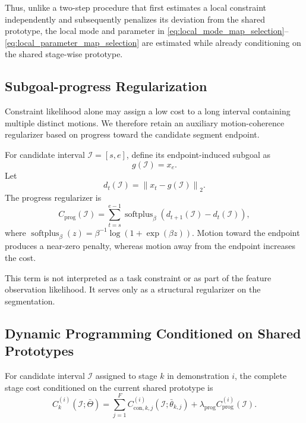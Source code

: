 \documentclass[lettersize,journal]{IEEEtran}
\begin{document}
Thus, unlike a two-step procedure that first estimates a local constraint
independently and subsequently penalizes its deviation from the shared
prototype, the local mode and parameter in
\eqref{eq:local_mode_map_selection}--\eqref{eq:local_parameter_map_selection}
are estimated while already conditioning on the shared stage-wise prototype.


\subsection{Subgoal-progress Regularization}
\label{subsec:subgoal_progress_map}

Constraint likelihood alone may assign a low cost to a long interval containing
multiple distinct motions. We therefore retain an auxiliary motion-coherence
regularizer based on progress toward the candidate segment endpoint.

For candidate interval
$\mathcal{I}=[s,e]$, define its endpoint-induced subgoal as
\begin{equation}
g(\mathcal{I})
=
x_e.
\label{eq:candidate_endpoint_subgoal_map}
\end{equation}
Let
\begin{equation}
d_t(\mathcal{I})
=
\left\|
x_t-g(\mathcal{I})
\right\|_2.
\label{eq:candidate_subgoal_distance_map}
\end{equation}
The progress regularizer is
\begin{equation}
C_{\mathrm{prog}}(\mathcal{I})
=
\sum_{t=s}^{e-1}
\operatorname{softplus}_{\beta}
\left(
d_{t+1}(\mathcal{I})
-
d_t(\mathcal{I})
\right),
\label{eq:progress_regularizer_map}
\end{equation}
where
$\operatorname{softplus}_{\beta}(z)
=
\beta^{-1}\log(1+\exp(\beta z))$.
Motion toward the endpoint produces a near-zero penalty, whereas motion away
from the endpoint increases the cost.

This term is not interpreted as a task constraint or as part of the feature
observation likelihood. It serves only as a structural regularizer on the
segmentation.


\subsection{Dynamic Programming Conditioned on Shared Prototypes}
\label{subsec:map_dynamic_programming}

For candidate interval $\mathcal{I}$ assigned to stage $k$ in demonstration $i$,
the complete stage cost conditioned on the current shared prototype is
\begin{equation}
C_k^{(i)}
\left(
\mathcal{I};
\bar{\Theta}
\right)
=
\sum_{j=1}^{F}
C_{\mathrm{con},k,j}^{(i)}
\left(
\mathcal{I};
\bar{\theta}_{k,j}
\right)
+
\lambda_{\mathrm{prog}}
C_{\mathrm{prog}}^{(i)}
\left(
\mathcal{I}
\right).
\label{eq:map_stage_cost}
\end{equation}
\end{document}
